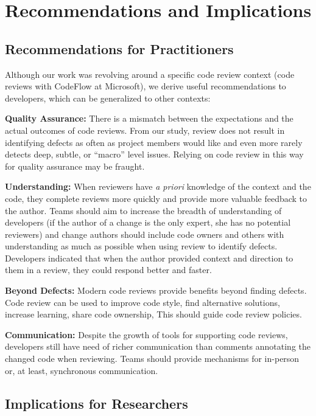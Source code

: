 
\section{Recommendations and Implications} \label{sec:implications}


\subsection{Recommendations for Practitioners}

Although our work was revolving around a specific code review context (\ie code reviews with CodeFlow at Microsoft), we derive useful recommendations to developers, which can be generalized to other contexts:

\textbf{Quality Assurance:} There is a mismatch between the expectations and the actual outcomes of code reviews. From our study, review does not result in identifying defects as often as project members would like and even more rarely detects deep, subtle, or ``macro'' level issues. Relying on code review in this way for quality assurance may be fraught.

\textbf{Understanding:} When reviewers have \emph{a priori} knowledge of the context and the code, they complete reviews more quickly and provide more valuable feedback to the author. Teams should aim to increase the breadth of understanding of developers (if the author of a change is the only expert, she has no potential reviewers) and change authors should include code owners and others with understanding as much as possible when using review to identify defects. Developers indicated that when the author provided context and direction to them in a review, they could respond better and faster.

\textbf{Beyond Defects:} Modern code reviews provide benefits beyond finding defects. Code review can be used to improve code style, find alternative solutions, increase learning, share code ownership, \etc This should guide code review policies.

\textbf{Communication:} Despite the growth of tools for supporting code reviews, developers still have need of richer communication than comments annotating the changed code when reviewing. Teams should provide mechanisms for in-person or, at least, synchronous communication.


\subsection{Implications for Researchers}

